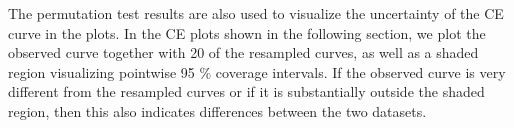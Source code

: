 \documentclass[titlepage,11pt,twoside]{article}
\begin{document}
The permutation test results are also used to visualize the uncertainty of the CE curve in the plots. In the CE plots shown in the following section, we plot the observed curve together with 20 of the resampled curves, as well as a shaded region visualizing pointwise 95 \% coverage intervals. If the observed curve is very different from the resampled curves or if it is substantially outside the shaded region, then this also indicates differences between the two datasets.

\end{document}
